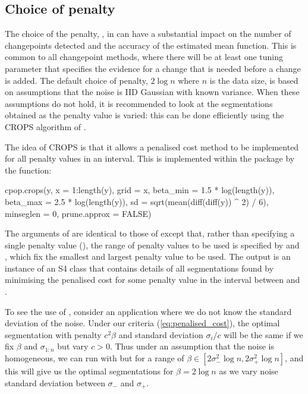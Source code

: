 \documentclass[article]{jss}
\begin{document}
\subsection{Choice of penalty}

The choice of the penalty, , in  can have a substantial impact on the number of changepoints detected and the accuracy of the estimated mean function. This is common to all changepoint methods, where there will be at least one tuning parameter that specifies the evidence for a change that is needed before a change is added. The default choice of penalty, $2\log n$ where $n$ is the data size, is based on assumptions that the noise is IID Gaussian with known variance. When these assumptions do not hold, it is recommended to look at the segmentations obtained as the penalty value is varied: this can be done efficiently using the CROPS algorithm of \cite{haynes2017computationally}. 

The idea of CROPS is that it allows a penalised cost method to be implemented for all penalty values in an interval. This is implemented within the  package by the function:
\begin{CodeInput}
cpop.crops(y, x = 1:length(y), grid = x, beta_min = 1.5 * log(length(y)),
  beta_max = 2.5 * log(length(y)), sd =  sqrt(mean(diff(diff(y)) ^ 2) / 6), 
  minseglen = 0, prune.approx = FALSE)
\end{CodeInput}
The arguments of  are identical to those of  except that, rather than specifying a single penalty value (), the range of penalty values to be used is specified by  and , which fix the smallest and largest penalty value to be used. The output is an instance of an S4 class that contains details of all segmentations found by minimising the penalised cost for some penalty value in the interval between  and .

To see the use of , consider an application where we do not know the standard deviation of the noise. Under our criteria (\ref{eq:penalised_cost}), the optimal segmentation with penalty $c^2 \beta$ and standard deviation $\sigma_i/c$ will be the same if we fix $\beta$ and $\sigma_{1:n}$ but vary $c>0$. Thus under an assumption that the noise is homogeneous, we can run  with  but for a range of $\beta \in [2\sigma_{-}^2\log n,2\sigma_{+}^2\log n]$, and this will give us the optimal segmentations for $\beta=2 \log n$ as we vary noise standard deviation between $\sigma_{-}$ and $\sigma_{+}$.
\end{document}
